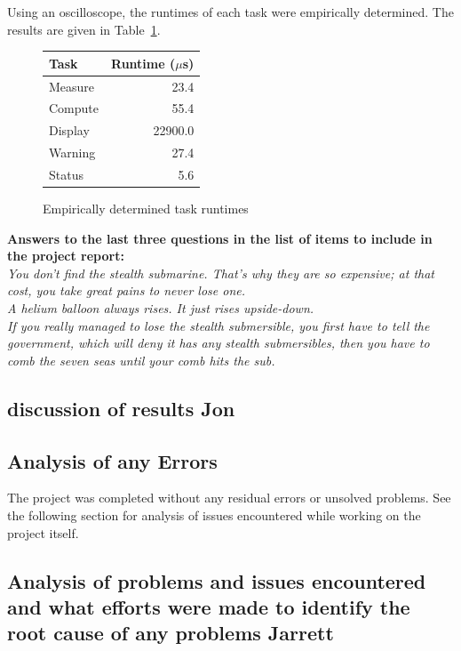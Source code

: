 \documentclass[12pt]{article} %
\begin{document}
Using an oscilloscope, the runtimes of each task were empirically determined. The results are given in Table~\ref{tab:taskRuntimes}.

\begin{figure}[h]
	\centering
	\begin{tabular}{|l|r|} 
		\hline
		Task & Runtime ($\mu$s) \\ \hline
		Measure & 23.4 \\ \hline
		Compute & 55.4 \\ \hline
		Display & 22900.0 \\ \hline
		Warning & 27.4	\\ \hline
		Status & 5.6	\\ \hline
	\end{tabular}
	\caption{Empirically determined task runtimes\label{tab:taskRuntimes}}
\end{figure}


\textbf{Answers to the last three questions in the list of items to include in the project report:} \\
\emph{You don't find the stealth submarine. That's why they are so expensive; at that cost, you take great pains to never lose one.\\
A helium balloon always rises. It just rises upside-down. \\
If you really managed to lose the stealth submersible, you first have to tell the government, which will deny it has any stealth submersibles, then you have to comb the seven seas until your comb hits the sub.}
 
\subsection{discussion of results  Jon}

\subsection{Analysis of any Errors}
The project was completed without any residual errors or unsolved problems. See the following section for analysis of issues encountered while working on the project itself.

\subsection{Analysis of problems and issues encountered and what efforts were made to identify the root cause of any problems  Jarrett}
\end{document}

